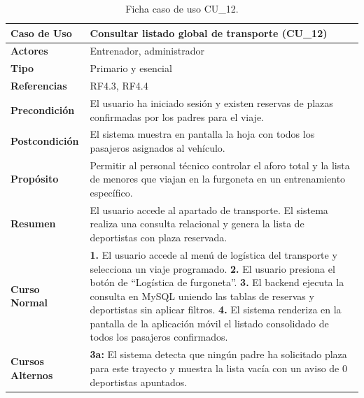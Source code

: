         \begin{table}[htbp]
        \centering
        \footnotesize
        \renewcommand{\arraystretch}{0.85}
        \begin{tabularx}{\textwidth}{|l|X|}
        \hline
        \rowcolor[HTML]{EFEFEF} 
        \textbf{Caso de Uso} & \textbf{Consultar listado global de transporte (CU\_12)} \\ \hline
        \textbf{Actores} & Entrenador, administrador \\ \hline
        \textbf{Tipo} & Primario y esencial \\ \hline
        \textbf{Referencias} & RF4.3, RF4.4 \\ \hline
        \textbf{Precondición} & El usuario ha iniciado sesión y existen reservas de plazas confirmadas por los padres para el viaje. \\ \hline
        \textbf{Postcondición} & El sistema muestra en pantalla la hoja con todos los pasajeros asignados al vehículo. \\ \hline
        \textbf{Propósito} & Permitir al personal técnico controlar el aforo total y la lista de menores que viajan en la furgoneta en un entrenamiento específico. \\ \hline
        \textbf{Resumen} & El usuario accede al apartado de transporte. El sistema realiza una consulta relacional y genera la lista de deportistas con plaza reservada. \\ \hline
        \textbf{Curso Normal} & 
        \textbf{1.} El usuario accede al menú de logística del transporte y selecciona un viaje programado.\newline
        \textbf{2.} El usuario presiona el botón de ``Logística de furgoneta''.\newline
        \textbf{3.} El backend ejecuta la consulta en MySQL uniendo las tablas de reservas y deportistas sin aplicar filtros.\newline
        \textbf{4.} El sistema renderiza en la pantalla de la aplicación móvil el listado consolidado de todos los pasajeros confirmados. \\ \hline
        \textbf{Cursos Alternos} & 
        \textbf{3a:} El sistema detecta que ningún padre ha solicitado plaza para este trayecto y muestra la lista vacía con un aviso de 0 deportistas apuntados. \\ \hline
        \end{tabularx}
        \caption{Ficha caso de uso CU\_12.}
        \label{tab:cu_12}
        \end{table}


